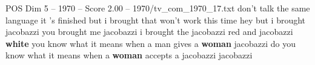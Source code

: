\begin{textsample}{POS Dim 5 – 1970 – Score 2.00 – 1970/tv\_com\_1970\_17.txt}  \label{ex:f5_pos_054}
don't talk the same language it 's finished but i brought that won't work this time hey but i brought jacobazzi you brought me jacobazzi i brought the jacobazzi red and jacobazzi \textbf{white} you know what it means when a man gives a \textbf{woman} jacobazzi do you know what it means when a \textbf{woman} accepts a jacobazzi jacobazzi

\end{textsample}
